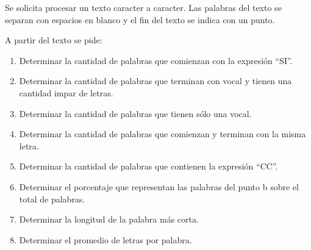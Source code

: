 Se solicita procesar un texto caracter a caracter. Las palabras del texto se separan con espacios en blanco y el fin del texto se indica con un punto.

A partir del texto se pide:
\begin{enumerate}[label=\alph*., labelindent=\parindent, leftmargin=2\parindent]
\item Determinar la cantidad de palabras que comienzan con la expresión ``SI''.

\item Determinar la cantidad de palabras que terminan con vocal y tienen una cantidad impar de letras.

\item Determinar la cantidad de palabras que tienen sólo una vocal.

\item Determinar la cantidad de palabras que comienzan y terminan con la misma letra.

\item Determinar la cantidad de palabras que contienen la expresión ``CC''.

\item Determinar el porcentaje que representan las palabras del punto b sobre el total de palabras.

\item Determinar la longitud de la palabra más corta.

\item Determinar el promedio de letras por palabra.
\end{enumerate}
